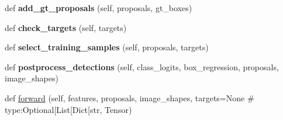 \begin{DoxyCompactItemize}
def {\bfseries add\+\_\+gt\+\_\+proposals} (self, proposals, gt\+\_\+boxes)
\item 
\mbox{\label{classtorchvision_1_1models_1_1detection_1_1roi__heads_1_1RoIHeads_ab6e2eaf8e739d74296f071cf3fa68ae2}} 
def {\bfseries check\+\_\+targets} (self, targets)
\item 
\mbox{\label{classtorchvision_1_1models_1_1detection_1_1roi__heads_1_1RoIHeads_a6ca710a81b61da1c48575595020faf53}} 
def {\bfseries select\+\_\+training\+\_\+samples} (self, proposals, targets)
\item 
\mbox{\label{classtorchvision_1_1models_1_1detection_1_1roi__heads_1_1RoIHeads_a695df5d7dd16cb0c6f48c0932c64cb72}} 
def {\bfseries postprocess\+\_\+detections} (self, class\+\_\+logits, box\+\_\+regression, proposals, image\+\_\+shapes)
\item 
def \hyperlink{classtorchvision_1_1models_1_1detection_1_1roi__heads_1_1RoIHeads_a710a4c0620e0f61e0ab57219755fadec}{forward} (self, features, proposals, image\+\_\+shapes, targets=None \# type\+:\+Optional\mbox{[}List\mbox{[}Dict\mbox{[}str, Tensor)
\end{DoxyCompactItemize}
